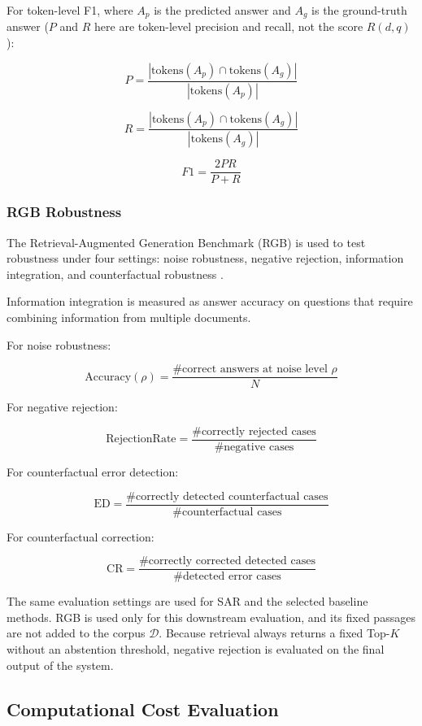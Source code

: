 \documentclass[12pt,a4paper]{report}
\begin{document}
For token-level F1, where $A_p$ is the predicted answer and $A_g$ is the ground-truth answer ($P$ and $R$ here are token-level precision and recall, not the score $R(d,q)$):

\[
P
=
\frac{
|\mathrm{tokens}(A_p)\cap\mathrm{tokens}(A_g)|
}
{|\mathrm{tokens}(A_p)|}
\]

\[
R
=
\frac{
|\mathrm{tokens}(A_p)\cap\mathrm{tokens}(A_g)|
}
{|\mathrm{tokens}(A_g)|}
\]

\[
F1
=
\frac{2PR}{P+R}
\]

\subsubsection{RGB Robustness}

The Retrieval-Augmented Generation Benchmark (RGB) is used to test
robustness under four settings: noise robustness, negative rejection,
information integration, and counterfactual robustness
\cite{chen2024rgb}.

Information integration is measured as answer accuracy on questions that require combining information from multiple documents.

For noise robustness:

\[
\mathrm{Accuracy}(\rho)
=
\frac{
\#\text{correct answers at noise level }\rho
}
{N}
\]

For negative rejection:

\[
\mathrm{RejectionRate}
=
\frac{
\#\text{correctly rejected cases}
}
{
\#\text{negative cases}
}
\]

For counterfactual error detection:

\[
\mathrm{ED}
=
\frac{
\#\text{correctly detected counterfactual cases}
}
{
\#\text{counterfactual cases}
}
\]

For counterfactual correction:

\[
\mathrm{CR}
=
\frac{
\#\text{correctly corrected detected cases}
}
{
\#\text{detected error cases}
}
\]

The same evaluation settings are used for SAR and the selected baseline
methods. RGB is used only for this downstream evaluation, and its fixed passages are not added to the corpus $\mathcal{D}$. Because retrieval always returns a fixed Top-$K$ without an abstention threshold, negative rejection is evaluated on the final output of the system.

\subsection{Computational Cost Evaluation}
\end{document}
